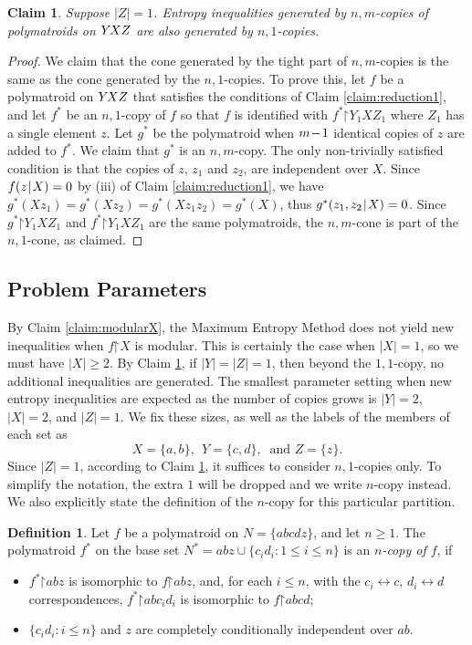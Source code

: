 \documentclass[reqno]{amsart}
\newtheorem{claim}[theorem]{Claim}
\theoremstyle{definition}
\newtheorem{definition}{Definition}
\newcommand\tsp{\mkern 1.5mu}
\def\|{\mkern1.5mu{|}\mkern1.5mu}
\def\restr{\mathord\upharpoonright}
\renewcommand\ge{\geqslant}\renewcommand\le{\leqslant}
\def\m#1{\tsp{#1}\tsp}
\def\YXZ{Y\mkern-2mu XZ}
\begin{document}
\begin{claim}\label{claim:singleZ}
Suppose $|Z|=1$. Entropy inequalities generated by $n,m$-copies of
polymatroids on $\YXZ$ are also generated by $n,1$-copies.
\end{claim}
\begin{proof}
We claim that the cone generated by the tight part of $n,m$-copies is the
same as the cone generated by the $n,1$-copies. To prove this, let $f$ be a
polymatroid on $\YXZ$ that satisfies the conditions of Claim
\ref{claim:reduction1}, and let $f^*$ be an $n,1$-copy of $f$ so that $f$ is
identified with $f^*\restr Y_1XZ_1$ where $Z_1$ has a single element $z$.
Let $g^*$ be the polymatroid when $m\m-1$ identical copies of $z$ are added
to $f^*$. We claim that $g^*$ is an $n,m$-copy. The only non-trivially
satisfied condition is that the copies of $z$, $z_1$ and $z_2$, are
independent over $X$. Since $f(z\|X)=0$ by (iii) of Claim
\ref{claim:reduction1}, we have $g^*(Xz_1)=g^*(Xz_2)=g^*(Xz_1z_2)= g^*(X)$,
thus $g^*(z_1,z_2\|X)=0$. Since $g^*\restr Y_1XZ_1$ and $f^*\restr Y_1XZ_1$
are the same polymatroids, the $n,m$-cone is part of the $n,1$-cone, as
claimed.
\end{proof}

\subsection{Problem Parameters}

By Claim \ref{claim:modularX}, the Maximum Entropy Method does not yield new
inequalities when $f\restr X$ is modular. This is certainly the case when
$|X|=1$, so we must have $|X|\ge 2$. By Claim \ref{claim:singleZ}, if
$|Y|=|Z|=1$, then beyond the $1,1$-copy, no additional inequalities are
generated. The smallest parameter setting when new entropy inequalities are
expected as the number of copies grows is $|Y|=2$, $|X|=2$, and $|Z|=1$. We
fix these sizes, as well as the labels of the members of each set as
$$
   X=\{a,b\}, ~~ Y=\{c,d\}, ~\mbox{ and  } Z=\{z\}.
$$
Since $|Z|=1$, according to Claim \ref{claim:singleZ}, it suffices to
consider $n,1$-copies only. To simplify the notation, the extra $1$ will be
dropped and we write $n$-copy instead. We also explicitly state the
definition of the $n$-copy for this particular partition.

\begin{definition}\label{def:n-copy}
Let $f$ be a polymatroid on $N=\{abcdz\}$, and let $n\ge 1$. The
polymatroid $f^*$ on the base set $N^*=abz\cup\{c_id_i:1\le i\le n\}$
is an \emph{$n$-copy of $f$}, if
\begin{itemize}
\item[(i)] $f^*\restr abz$ is isomorphic to $ f\restr abz$,
 and, for each $i\le n$, with the $c_i\leftrightarrow c$, $d_i
 \leftrightarrow d$ correspondences,  $f^*\restr abc_id_i$ is
 isomorphic to $f\restr abcd$; 
\item[(ii)]
   $\{c_id_i:i\le n\}$ and $z$ are completely conditionally 
   independent over $ab$.
\end{itemize}
\end{definition}
\end{document}
